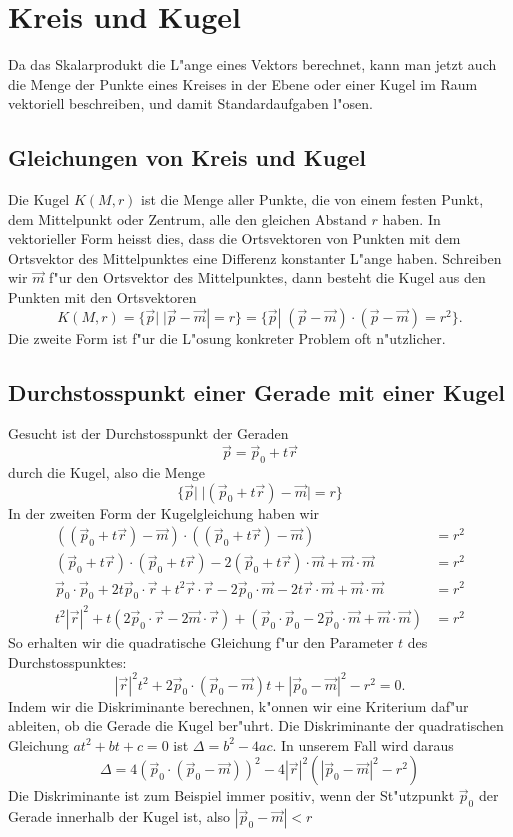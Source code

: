 \section{Kreis und Kugel}
Da das Skalarprodukt die L"ange eines Vektors berechnet, kann man
jetzt auch die Menge der Punkte eines Kreises in der Ebene
oder einer Kugel im Raum vektoriell beschreiben, und damit Standardaufgaben
l"osen.
\subsection{Gleichungen von Kreis und Kugel}
Die Kugel $K(M,r)$ ist die Menge aller Punkte, die von einem festen Punkt, dem
Mittelpunkt oder Zentrum, alle den gleichen Abstand $r$ haben. In vektorieller
Form heisst dies, dass die Ortsvektoren von Punkten mit dem Ortsvektor des
Mittelpunktes eine Differenz konstanter L"ange haben. Schreiben wir $\vec m$
f"ur den Ortsvektor des Mittelpunktes, dann besteht die Kugel aus den
Punkten mit den
Ortsvektoren 
\[
K(M,r)
=
\{\vec p| \;|\vec p-\vec m|=r\}
=
\{\vec p| \;(\vec p-\vec m)\cdot(\vec p-\vec m)=r^2\}.
\]
Die zweite Form ist f"ur die L"osung konkreter Problem oft n"utzlicher.
\subsection{Durchstosspunkt einer Gerade mit einer Kugel\label{durchstosspunktkugel}}
Gesucht ist der Durchstosspunkt der Geraden 
\[
\vec p=\vec p_0+t\vec r
\]
durch die Kugel, also die Menge
\[
\{\vec p| \;|(\vec p_0+t\vec r)-\vec m|=r\}
\]
In der zweiten Form der Kugelgleichung haben wir
\begin{align*}
((\vec p_0+t\vec r)-\vec m)
\cdot
((\vec p_0+t\vec r)-\vec m)&=r^2
\\
(\vec p_0+t\vec r)
\cdot
(\vec p_0+t\vec r)
-2
(\vec p_0+t\vec r)\cdot \vec m
+\vec m\cdot\vec m&=r^2
\\
\vec p_0\cdot\vec p_0
+2t\vec p_0\cdot\vec r
+t^2\vec r\cdot\vec r
-2\vec p_0\cdot\vec m
-2t\vec r\cdot\vec m
+\vec m\cdot\vec m&=r^2
\\
t^2|\vec r|^2
+t(2\vec p_0\cdot\vec r-2\vec m\cdot\vec r)
+(\vec p_0\cdot\vec p_0-2\vec p_0\cdot\vec m+\vec m\cdot\vec m)&=r^2
\end{align*}
So erhalten wir die quadratische Gleichung f"ur den Parameter $t$
des Durchstosspunktes:
\[
|\vec r|^2t^2
+2\vec p_0\cdot(\vec p_0-\vec m)t
+|\vec p_0-\vec m|^2-r^2 =0.
\]
Indem wir die Diskriminante berechnen,  k"onnen wir eine Kriterium
daf"ur ableiten, ob die Gerade die Kugel ber"uhrt. Die Diskriminante
der quadratischen Gleichung $at^2+bt+c=0$ ist $\Delta = b^2-4ac$. In unserem
Fall wird daraus
\[
\Delta
=
4(\vec p_0\cdot(\vec p_0-\vec m))^2-
4|\vec r|^2(
|\vec p_0-\vec m|^2-r^2
)
\]
Die Diskriminante ist zum Beispiel immer positiv, wenn der St"utzpunkt
$\vec p_0$
der Gerade innerhalb der Kugel ist, also $|\vec p_0-\vec m|<r$
